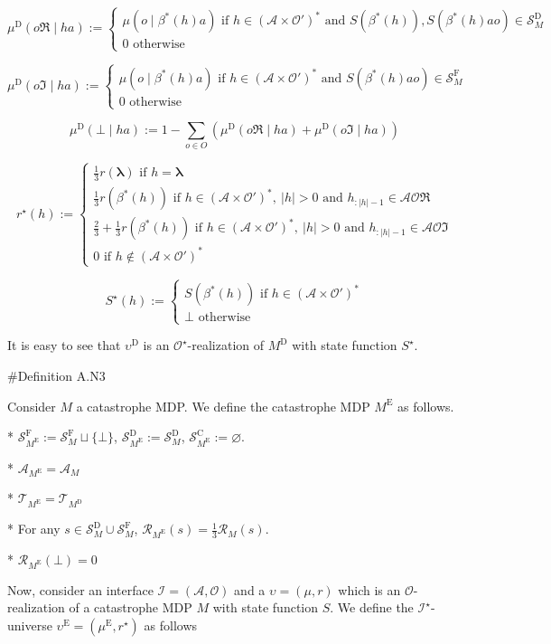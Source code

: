\documentclass[a4paper]{article}
\newcommand{\AP}[1]{\left(#1\right)}
\newcommand{\Estr}{\boldsymbol{\lambda}}
\newcommand{\Abs}[1]{\left\vert #1 \right\vert}
\newcommand{\Ob}{\mathcal{O}}
\newcommand{\A}{\mathcal{A}}
\newcommand{\St}{\mathcal{S}}
\newcommand{\T}{\mathcal{T}}
\newcommand{\R}{\mathcal{R}}
\newcommand{\In}{\mathcal{I}}
\newcommand{\RMC}{\mathrm{C}}
\newcommand{\RMD}{\mathrm{D}}
\newcommand{\RME}{\mathrm{E}}
\newcommand{\RMF}{\mathrm{F}}
\newcommand{\SF}{\St^{\RMF}}
\newcommand{\SD}{\St^{\RMD}}
\newcommand{\SC}{\St^{\RMC}}
\newcommand{\MD}{M^{\RMD}}
\newcommand{\ME}{M^{\RME}}
\newcommand{\UD}{\upsilon^{\RMD}}
\begin{document}
$$\mu^\RMD(o\Re \mid ha) := \begin{cases} \mu\AP{o \mid \beta^*(h)a} \text{ if } h\in\AP{\A \times \Ob'}^* \text{ and } S\AP{\beta^*(h)},S\AP{\beta^*(h)ao}\in\SD_M \\ 0 \text{ otherwise} \end{cases}$$

$$\mu^\RMD(o\Im \mid ha) := \begin{cases} \mu\AP{o \mid \beta^*(h)a} \text{ if } h\in\AP{\A \times \Ob'}^* \text{ and } S\AP{\beta^*(h)ao}\in\SF_M \\ 0 \text{ otherwise} \end{cases}$$

$$\mu^\RMD(\bot \mid ha) := 1 - \sum_{o \in O} \AP{\mu^\RMD(o\Re \mid ha) + \mu^\RMD(o\Im \mid ha)}$$

$$r^\star(h):=\begin{cases} \frac{1}{3}r(\Estr) \text{ if } h = \Estr \\ \frac{1}{3}r\AP{\beta^*(h)} \text{ if } h\in\AP{\A \times \Ob'}^*,\ \Abs{h}>0 \text{ and } h_{:\Abs{h}-1}\in\A\Ob\Re \\ \frac{2}{3} + \frac{1}{3}r\AP{\beta^*(h)} \text{ if } h\in\AP{\A \times \Ob'}^*,\ \Abs{h}>0 \text{ and } h_{:\Abs{h}-1}\in\A\Ob\Im \\ 0 \text{ if } h\not\in\AP{\A \times \Ob'}^* \end{cases}$$

$$S^\star(h):=\begin{cases} S\AP{\beta^*(h)} \text{ if } h\in\AP{\A \times \Ob'}^* \\ \bot \text{ otherwise} \end{cases}$$

It is easy to see that $\UD$ is an $\Ob^\star$-realization of $\MD$ with state function $S^\star$.

\#Definition A.N3

Consider $M$ a catastrophe MDP. We define the catastrophe MDP $\ME$ as follows.

* $\SF_{\ME}:=\SF_M \sqcup \{\bot\}$, $\SD_{\ME}:=\SD_M$, $\SC_{\ME}:=\varnothing$.

* $\A_{\ME} = \A_M$

* $\T_{\ME} = \T_{\MD}$

* For any $s \in \SD_M \cup \SF_M$, $\R_{\ME}(s) = \frac{1}{3}\R_M(s)$.

* $\R_{\ME}(\bot) = 0$

Now, consider an interface $\In=(\A,\Ob)$ and a $\upsilon=(\mu,r)$ which is an $\Ob$-realization of a catastrophe MDP $M$ with state function $S$. We define the $\In^\star$-universe $\upsilon^\RME=(\mu^\RME,r^\star)$ as follows
\end{document}
